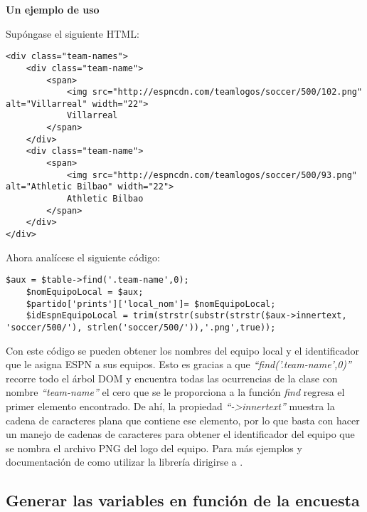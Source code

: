 \textbf{Un ejemplo de uso}

Supóngase el siguiente HTML:

\lstset{language=HTML}
\begin{lstlisting}[frame=single]
<div class="team-names">
	<div class="team-name">
		<span>
			<img src="http://espncdn.com/teamlogos/soccer/500/102.png" alt="Villarreal" width="22">
			Villarreal
		</span>
	</div>
	<div class="team-name">
		<span>
			<img src="http://espncdn.com/teamlogos/soccer/500/93.png" alt="Athletic Bilbao" width="22">
			Athletic Bilbao
		</span>
	</div>
</div>
\end{lstlisting}

Ahora analícese el siguiente código:

\lstset{language=PHP}
\begin{lstlisting}[frame=single]
	$aux = $table->find('.team-name',0);
	$nomEquipoLocal = $aux;
	$partido['prints']['local_nom']= $nomEquipoLocal;
	$idEspnEquipoLocal = trim(strstr(substr(strstr($aux->innertext, 'soccer/500/'), strlen('soccer/500/')),'.png',true));
\end{lstlisting}


Con este código se pueden obtener los nombres del equipo local y el identificador que le asigna ESPN a sus equipos. Esto es gracias a que \emph{``find('.team-name',0)''} recorre todo el árbol DOM y encuentra todas las ocurrencias de la clase con nombre \emph{``team-name''} el cero que se le proporciona a la función \emph{find} regresa el primer elemento encontrado. De ahí, la propiedad \emph{``->innertext''} muestra la cadena de caracteres plana que contiene ese elemento, por lo que basta con hacer un manejo de cadenas de caracteres para obtener el identificador del equipo que se nombra el archivo PNG del logo del equipo. Para más ejemplos y documentación de como utilizar la librería dirigirse a \cite{sourceparserWeb}.



\subsection{Generar las variables en función de la encuesta}




